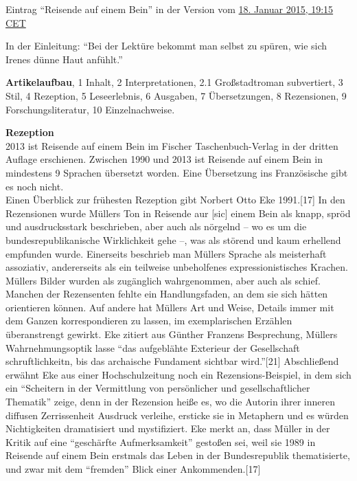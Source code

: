 \documentclass[fontsize=12pt]{scrartcl}
\begin{document}
Eintrag "`Reisende auf einem Bein"' in der Version vom \href{https://de.wikipedia.org/w/index.php?title=Reisende_auf_einem_Bein\&oldid=137915300}{18. Januar 2015, 19:15 CET}

In der Einleitung: "`Bei der Lekt\"ure bekommt man \mbox{selbst} zu sp\"uren, wie sich Irenes d\"unne Haut anf\"uhlt."'

\textbf{Artikelaufbau}, 1 Inhalt, 2 Interpretationen, 2.1 Gro{\ss}stadtroman subvertiert, 3 Stil, 4 Rezeption, 5 Leseerlebnis, 6 Ausgaben, 7 \"Ubersetzungen, 8 Rezensionen, 9 For\-schungsli\-te\-ra\-tur, 10 Einzelnachweise.
 
\textbf{Rezeption}\\
2013 ist Reisende auf einem Bein im Fischer Taschenbuch-Verlag in der drit\-ten Auf\-lage erschienen. Zwischen 1990 und 2013 ist Reisende auf einem Bein in mindestens 9 Sprachen \"ubersetzt worden. Eine \"Ubersetzung ins Franz\"osische gibt es noch nicht.\\
Einen \"Uberblick zur fr\"uhesten Rezeption gibt Norbert Otto Eke 1991.[17] In den Rezensionen wurde M\"ullers Ton in Reisende aur [sic] einem Bein als knapp, spr\"od und ausdrucksstark beschrieben, aber auch als n\"orgelnd -- wo es um die bundesrepublikanische Wirklichkeit gehe --, was als st\"orend und kaum erhellend empfunden wurde. Einerseits beschrieb man M\"ullers Sprache als meisterhaft assoziativ, an\-de\-rerseits als ein teilweise unbeholfenes expressionistisches Krachen. M\"ullers Bilder wurden als zug\"ang\-lich wahrgenommen, aber auch als schief. Manchen der Rezensenten fehlte ein Handlungsfaden, an dem sie sich h\"atten orientieren k\"onnen. Auf andere hat M\"ullers Art und Weise, Details immer mit dem Ganzen korrespondieren zu lassen, im exemplarischen Erz\"ahlen \"uberanstrengt gewirkt. Eke zitiert aus G\"unther Franzens Besprechung, M\"ullers Wahrnehmungsoptik lasse "`das aufgebl\"ahte Exterieur der Ge\-sell\-schaft schruft\-lich\-keitn, bis das archaische Fundament sichtbar wird."'[21] Abschlie{\ss}end erw\"ahnt Eke aus einer Hochschulzeitung noch ein Rezensions-Beispiel, in dem sich ein "`Scheitern in der Ver\-mitt\-lung von pers\"onlicher und ge\-sell\-schaft\-li\-cher Thematik"' zeige, denn in der Rezension hei{\ss}e es, wo die Autorin ihrer inneren diffusen Zerrissenheit Ausdruck verleihe, ersticke sie in Metaphern und es w\"urden Nichtigkei\-ten dramatisiert und mystifiziert. Eke merkt an, dass M\"uller in der Kritik auf eine "`gesch\"arfte Aufmerksamkeit"' gesto{\ss}en sei, weil sie 1989 in Reisende auf einem Bein erstmals das Leben in der Bundesrepublik thematisierte, und zwar mit dem "`fremden"' Blick einer Ankommenden.[17]
\end{document}
